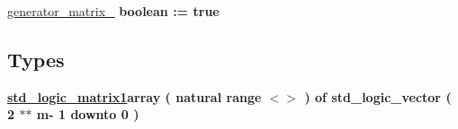 \begin{DoxyCompactItemize}
\item 
\hypertarget{group___r_m_encoder_ga57b43bd889cdfa2bf9597490517dd675}{\hyperlink{group___r_m_encoder_ga57b43bd889cdfa2bf9597490517dd675}{generator\+\_\+matrix\+\_} {\bfseries \textcolor{vhdlchar}{boolean}\textcolor{vhdlchar}{ }\textcolor{vhdlchar}{ }\textcolor{vhdlchar}{\+:}\textcolor{vhdlchar}{=}\textcolor{vhdlchar}{ }\textcolor{vhdlchar}{ }\textcolor{vhdlchar}{ }\textcolor{vhdlchar}{ }\textcolor{vhdlchar}{true}\textcolor{vhdlchar}{ }} }\label{group___r_m_encoder_ga57b43bd889cdfa2bf9597490517dd675}

\end{DoxyCompactItemize}
\subsection*{Types}
 \begin{DoxyCompactItemize}
\item 
\hypertarget{group___r_m_encoder_ga88b1f19c6b66040e3719ce83a8832903}{{\bfseries \hyperlink{group___r_m_encoder_ga88b1f19c6b66040e3719ce83a8832903}{std\+\_\+logic\+\_\+matrix1}{\bfseries \textcolor{vhdlchar}{array}\textcolor{vhdlchar}{ }\textcolor{vhdlchar}{(}\textcolor{vhdlchar}{ }\textcolor{vhdlchar}{natural}\textcolor{vhdlchar}{ }\textcolor{vhdlchar}{range}\textcolor{vhdlchar}{ }\textcolor{vhdlchar}{$<$$>$}\textcolor{vhdlchar}{ }\textcolor{vhdlchar}{)}\textcolor{vhdlchar}{ }\textcolor{vhdlchar}{ }\textcolor{vhdlchar}{of}\textcolor{vhdlchar}{ }\textcolor{vhdlchar}{std\+\_\+logic\+\_\+vector}\textcolor{vhdlchar}{ }\textcolor{vhdlchar}{(}\textcolor{vhdlchar}{ }\textcolor{vhdlchar}{ } \textcolor{vhdldigit}{2} \textcolor{vhdlchar}{$\ast$}\textcolor{vhdlchar}{$\ast$}\textcolor{vhdlchar}{ }\textcolor{vhdlchar}{ }\textcolor{vhdlchar}{ }\textcolor{vhdlchar}{m}\textcolor{vhdlchar}{-\/}\textcolor{vhdlchar}{ } \textcolor{vhdldigit}{1} \textcolor{vhdlchar}{ }\textcolor{vhdlchar}{downto}\textcolor{vhdlchar}{ }\textcolor{vhdlchar}{ } \textcolor{vhdldigit}{0} \textcolor{vhdlchar}{ }\textcolor{vhdlchar}{)}\textcolor{vhdlchar}{ }}} }\label{group___r_m_encoder_ga88b1f19c6b66040e3719ce83a8832903}


\end{DoxyCompactItemize}
